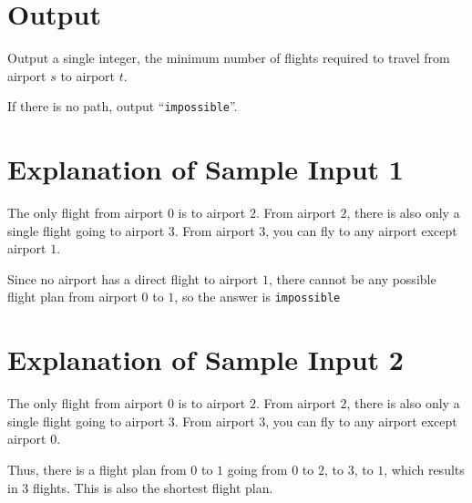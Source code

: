 \section*{Output}
Output a single integer, the minimum number of flights required to travel from airport $s$ to airport $t$.

If there is no path, output ``\texttt{impossible}''.

\section*{Explanation of Sample Input 1}
The only flight from airport $0$ is to airport $2$.
From airport $2$, there is also only a single flight going to airport $3$.
From airport $3$, you can fly to any airport except airport $1$.

Since no airport has a direct flight to airport $1$, there cannot be any possible flight plan from airport $0$ to $1$, so the answer is \texttt{impossible}

\section*{Explanation of Sample Input 2}
The only flight from airport $0$ is to airport $2$.
From airport $2$, there is also only a single flight going to airport $3$.
From airport $3$, you can fly to any airport except airport $0$.

Thus, there is a flight plan from $0$ to $1$ going from $0$ to $2$, to $3$, to $1$, which results in 3 flights.
This is also the shortest flight plan.
